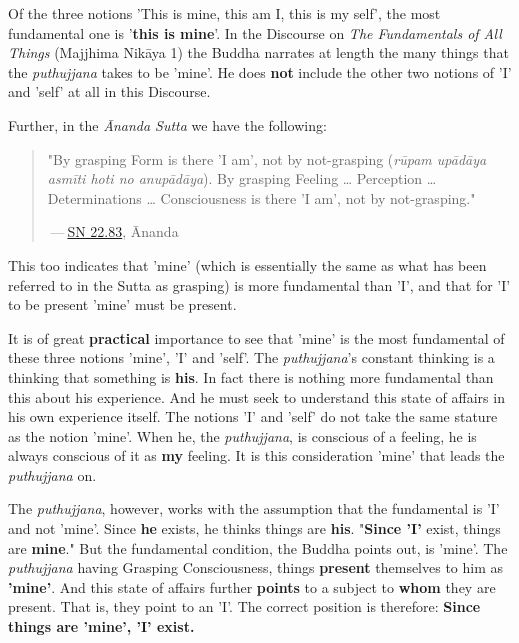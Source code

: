 Of the three notions 'This is mine, this am I, this is my self', the
most fundamental one is '\textbf{this is mine}'. In the Discourse on \emph{The
Fundamentals of All Things} (Majjhima Nikāya 1) the Buddha
narrates at length the many things that the \emph{puthujjana} takes to be
'mine'. He does \textbf{not} include the other two notions of 'I' and 'self' at
all in this Discourse.


Further, in the \emph{Ānanda Sutta} we have the following:


\begin{quotation}
"By grasping Form is there 'I am', not by not-grasping (\emph{rūpam upādāya
asmīti hoti no anupādāya}). By grasping Feeling … Perception …
Determinations … Consciousness is there 'I am', not by not-grasping."


 — \href{https://suttacentral.net/sn22.83/en/bodhi}{SN 22.83}, Ānanda


\end{quotation}

This too indicates that 'mine' (which is essentially the same as what
has been referred to in the Sutta as grasping) is more fundamental
than 'I', and that for 'I' to be present 'mine' must be present.


It is of great \textbf{practical} importance to see that 'mine' is the most
fundamental of these three notions 'mine', 'I' and 'self'. The
\emph{puthujjana}'s constant thinking is a thinking that something is
\textbf{his}. In fact there is nothing more fundamental than this about his
experience. And he must seek to understand this state of affairs in his
own experience itself. The notions 'I' and 'self' do not take the same
stature as the notion 'mine'. When he, the \emph{puthujjana}, is conscious
of a feeling, he is always conscious of it as \textbf{my} feeling. It is this
consideration 'mine' that leads the \emph{puthujjana} on.


The \emph{puthujjana}, however, works with the assumption that the
fundamental is 'I' and not 'mine'. Since \textbf{he} exists, he thinks things
are \textbf{his}. "\textbf{Since 'I'} exist, things are \textbf{mine}." But the
fundamental condition, the Buddha points out, is 'mine'. The
\emph{puthujjana} having Grasping Consciousness, things \textbf{present} themselves
to him as \textbf{'mine'}. And this state of affairs further \textbf{points} to a
subject to \textbf{whom} they are present. That is, they point to an 'I'. The
correct position is therefore: \textbf{Since things are 'mine', 'I' exist.}


